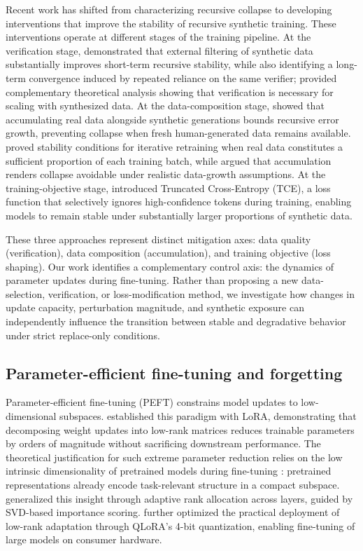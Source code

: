 \documentclass[a4paper,fleqn]{cas-dc}
\begin{document}
Recent work has shifted from characterizing recursive collapse to developing
interventions that improve the stability of recursive synthetic training. These
interventions operate at different stages of the training pipeline.
At the verification stage, \citet{yi2025} demonstrated that external filtering
of synthetic data substantially improves short-term recursive stability, while
also identifying a long-term convergence induced by repeated reliance on the
same verifier; \citet{feng2025verification} provided complementary theoretical
analysis showing that verification is necessary for scaling with synthesized
data. At the data-composition stage, \citet{gerstgrasser2024} showed
that accumulating real data alongside synthetic generations bounds recursive
error growth, preventing collapse when fresh human-generated data remains
available. \citet{bertrand2024stability} proved stability conditions for
iterative retraining when real data constitutes a sufficient proportion of each
training batch, while \citet{kazdan2025accumulation} argued that accumulation
renders collapse avoidable under realistic data-growth assumptions. At the
training-objective stage, \citet{zibakhsh2024} introduced
Truncated Cross-Entropy (TCE), a loss function that selectively ignores
high-confidence tokens during training, enabling models to remain stable under
substantially larger proportions of synthetic data.

These three approaches represent distinct mitigation axes: data quality
(verification), data composition (accumulation), and training objective (loss
shaping). Our work identifies a complementary control axis: the dynamics of
parameter updates during fine-tuning. Rather than proposing a new
data-selection, verification, or loss-modification method, we investigate how
changes in update capacity, perturbation magnitude, and synthetic exposure
can independently influence the transition between stable and degradative
behavior under strict replace-only conditions.

\subsection{Parameter-efficient fine-tuning and forgetting}

Parameter-efficient fine-tuning (PEFT) constrains model updates to
low-dimensional subspaces. \citet{hu2022} established this paradigm with LoRA,
demonstrating that decomposing weight updates into low-rank matrices reduces
trainable parameters by orders of magnitude without sacrificing downstream
performance. The theoretical justification for such extreme parameter reduction
relies on the low intrinsic dimensionality of pretrained models during
fine-tuning \citep{aghajanyan2021}: pretrained representations already encode
task-relevant structure in a compact subspace. \citet{zhang2023adalora}
generalized this insight through adaptive rank allocation across layers, guided
by SVD-based importance scoring. \citet{dettmers2023} further optimized the
practical deployment of low-rank adaptation through QLoRA's 4-bit quantization,
enabling fine-tuning of large models on consumer hardware.
\end{document}
